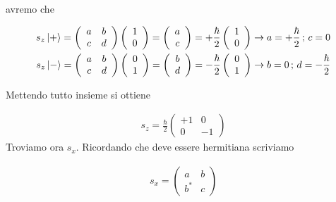 avremo che

\begin{align}
s_z\ket{+}= \left(
\begin{array}{ccc}
a & b \\
c & d
\end{array}
\right)
\left(
\begin{array}{cc}
1 \\
0
\end{array}
\right) =
\left(
\begin{array}{cc}
a \\
c
\end{array}
\right) =
+\frac{\hbar}{2} \left(
\begin{array}{cc}
1 \\
0
\end{array}
\right) \rightarrow a= +\frac{\hbar}{2} \, ; \, c=0 \\
s_z\ket{-}= \left(
\begin{array}{ccc}
a & b \\
c & d
\end{array}
\right)
\left(
\begin{array}{cc}
0 \\
1
\end{array}
\right) =
\left(
\begin{array}{cc}
b \\
d
\end{array}
\right) =
-\frac{\hbar}{2} \left(
\begin{array}{cc}
0 \\
1
\end{array}
\right) \rightarrow  b=0 \, ; \, d=-\frac{\hbar}{2}
\end{align}

Mettendo tutto insieme si ottiene

\begin{align}
s_z = \frac{\hbar}{2}\left(
\begin{array}{ccc}
+1 & 0 \\
0 & -1
\end{array}
\right)
\end{align}
Troviamo ora $s_x$. Ricordando che deve essere hermitiana scriviamo

\begin{align}
s_x = \left(
\begin{array}{ccc}
a & b \\
b^* & c
\end{array}
\right)
\end{align}

